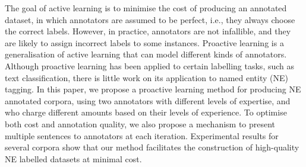 The goal of active learning is to minimise the cost of producing an annotated dataset, in which annotators are assumed to be perfect, i.e., they always choose the correct labels. However, in practice, annotators are not infallible, and they are likely to assign incorrect labels to some instances. Proactive learning is a generalisation of active learning that can model different kinds of annotators. Although proactive learning has been applied to certain labelling tasks, such as text classification, there is little work on its application to named entity (NE) tagging. In this paper, we propose a proactive learning method for producing NE annotated corpora, using two annotators with different levels of expertise, and who charge different amounts based on their levels of experience. To optimise both cost and annotation quality, we also propose a mechanism to present multiple sentences to annotators at each iteration. Experimental results for several corpora show that our method facilitates the construction of high-quality NE labelled datasets at minimal cost.
